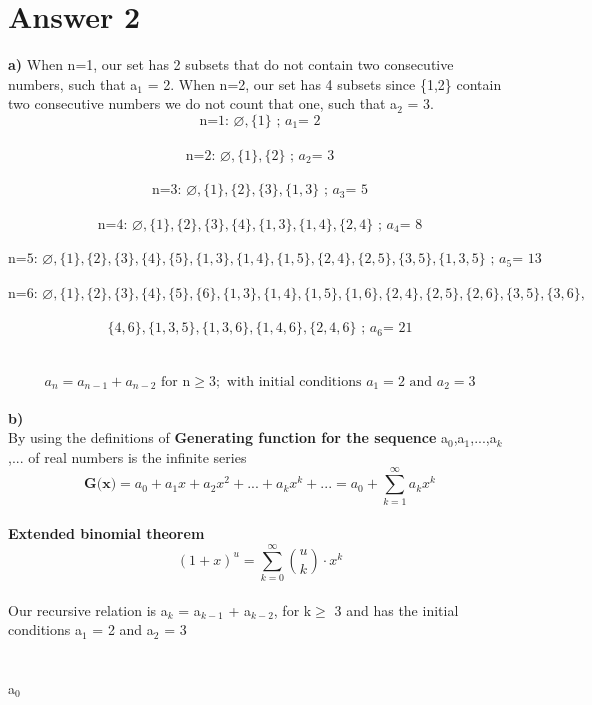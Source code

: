 \documentclass[12pt]{article}
\begin{document}
\section*{Answer 2}
\textbf{a)} When n=1, our set has 2 subsets that do not contain two consecutive numbers, such that a$_1$ = 2. When n=2, our set has 4 subsets since \{1,2\} contain two consecutive numbers we do not count that one, such that a$_2$ = 3. \\
\[\text{n=1: } \varnothing, \{1\}\text{ ; } a_{1}\text{= 2}\]\\
\[\text{n=2: } \varnothing, \{1\}, \{2\} \text{ ; } a_{2}\text{= 3}\]\\
\[\text{n=3: } \varnothing, \{1\}, \{2\}, \{3\},\{1,3\} \text{ ; } a_{3}\text{= 5}\]\\
\[\text{n=4: } \varnothing, \{1\}, \{2\}, \{3\},\{4\},\{1,3\},\{1,4\},\{2,4\} \text{ ; } a_{4}\text{= 8}\]\\
\[\text{n=5: } \varnothing, \{1\}, \{2\}, \{3\},\{4\},\{5\},\{1,3\},\{1,4\},\{1,5\},\{2,4\},\{2,5\},\{3,5\},\{1,3,5\} \text{ ; } a_{5}\text{= 13}\]\\
\[\text{n=6: } \varnothing, \{1\}, \{2\}, \{3\},\{4\},\{5\},\{6\},\{1,3\},\{1,4\},\{1,5\},\{1,6\},\{2,4\},\{2,5\},\{2,6\},\{3,5\},\{3,6\},\]\\
\[\{4,6\},\{1,3,5\},\{1,3,6\},\{1,4,6\},\{2,4,6\} \text{ ; } a_{6}\text{= 21}\]\\
\\
\[a_n = a_{n-1} + a_{n-2} \text{ for n}\geq3; \text{ with initial conditions } a_1 = 2 \text{ and } a_2 = 3\]\\
\textbf{b)}\\
By using the definitions of \textbf{Generating function for the sequence} a$_{0}$,a$_{1}$,...,a$_{k}$,... of real numbers is the infinite series\\
\[\textbf{G(x)} = a_{0} + a_{1}x + a_{2}x^{2} + ... + a_{k}x^{k} + ... = a_{0} + \sum_{k=1}^{\infty} a_{k}x^{k}\]\\
\textbf{Extended binomial theorem}\\
\[(1+x)^{u} = \sum_{k=0}^{\infty}\binom{u}{k}\cdot x^{k}\]\\
Our recursive relation is a$_{k}$ = a$_{k-1}$ + a$_{k-2}$, for k$\geq$ 3 and has the initial conditions a$_{1}$ = 2 and a$_{2}$ = 3\\
\vspace*{0.2cm}\\
\\
 a$_0$ \\
\\
\end{document}
